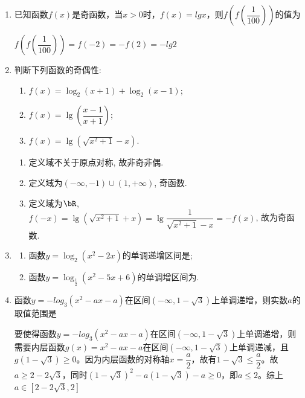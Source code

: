\begin{enumerate}
    \begin{jieda}
        \begin{enumerate}
            \item $a > 0$且$\Delta < 0$
            \item $a = 0$或$a > 0$且$\Delta \geq 0$
            \item 由复合函数单调性知$a > 1$，由最小值在内层抛物线顶点取，因此顶点应在$x$轴上方，故$\Delta < 0$
        \end{enumerate}
    \end{jieda}
    \item 已知函数$f(x)$是奇函数，当$x > 0$时，$f(x) = lgx$，则$f\left(f\left(\dfrac{1}{100}\right)\right)$的值为
    \begin{jieda}
        $f\left(f\left(\dfrac{1}{100}\right)\right) = f(-2) = -f(2) = -lg2$
    \end{jieda}
    \item 判断下列函数的奇偶性: 
    \begin{enumerate}
    \item $f(x)=\log_2(x+1)+\log_2(x-1)$; 
    \item $f(x)=\lg\left(\dfrac{x-1}{x+1}\right)$;
    \item $f(x)=\lg(\sqrt{x^2+1}-x)$.
    \end{enumerate}
    \begin{jieda}
    \begin{enumerate}
    \item 定义域不关于原点对称, 故非奇非偶. 
    \item 定义域为$(-\infty,-1)\cup(1,+\infty)$, 奇函数. 
    \item 定义域为$\bR$, $f(-x)=\lg(\sqrt{x^2+1}+x)=\lg\dfrac{1}{\sqrt{x^2+1}-x}=-f(x)$, 故为奇函数. 
    \end{enumerate}
    \end{jieda}
    
    \item 
    \begin{enumerate}[(1)]
    \item 函数$y=\log_2\left(x^2-2x\right)$的单调递增区间是; 
    \item 函数$y=\log_{\frac{1}{2}}(x^2-5x+6)$的单调增区间为. 
    \end{enumerate}
    
    \item 函数$y = -log_3(x^2-ax-a)$在区间$(-\infty, 1-\sqrt{3})$上单调递增，则实数$a$的取值范围是\blkda[2]{$[2-2\sqrt{3}, 2]$}
    \begin{jieda}
        要使得函数$y = -log_3(x^2-ax-a)$在区间$(-\infty, 1-\sqrt{3})$上单调递增，则需要内层函数$g(x) = x^2-ax-a$在区间$(-\infty, 1-\sqrt{3})$上单调递减，且$g(1-\sqrt{3}) \geq 0$。因为内层函数的对称轴$x = \dfrac{a}{2}$，故有$1-\sqrt{3} \leq \dfrac{a}{2}$。故$a \geq 2 - 2\sqrt{3}$，同时$(1-\sqrt{3})^2-a(1-\sqrt{3})-a \geq 0$，即$a \leq 2$。综上$a \in [2-2\sqrt{3}, 2]$
    \end{jieda}
    

\end{enumerate}
